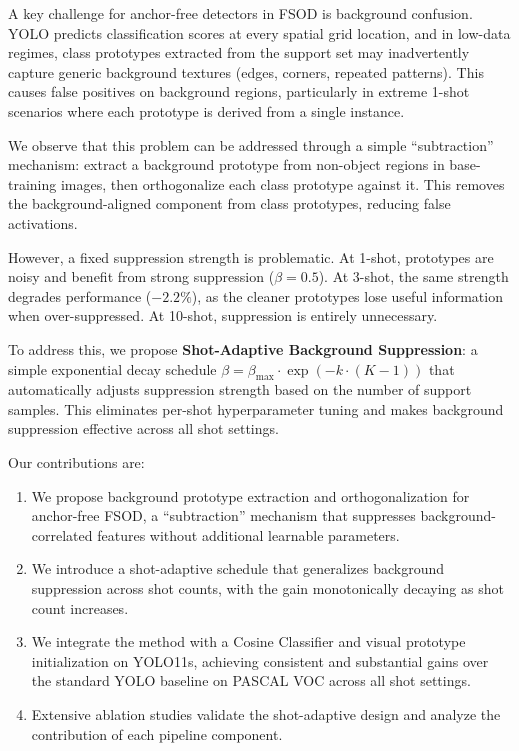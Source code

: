\documentclass[10pt,twocolumn,letterpaper]{article}
\begin{document}
A key challenge for anchor-free detectors in FSOD is background confusion.
YOLO predicts classification scores at every spatial grid location, and in low-data regimes,
class prototypes extracted from the support set may inadvertently capture generic background
textures (edges, corners, repeated patterns). This causes false positives on background regions,
particularly in extreme 1-shot scenarios where each prototype is derived from a single instance.

We observe that this problem can be addressed through a simple ``subtraction'' mechanism:
extract a background prototype from non-object regions in base-training images,
then orthogonalize each class prototype against it. This removes the background-aligned
component from class prototypes, reducing false activations.

However, a fixed suppression strength is problematic. At 1-shot, prototypes are noisy
and benefit from strong suppression ($\beta=0.5$). At 3-shot, the same strength degrades
performance ($-2.2\%$), as the cleaner prototypes lose useful information when over-suppressed.
At 10-shot, suppression is entirely unnecessary.

To address this, we propose \textbf{Shot-Adaptive Background Suppression}: a simple
exponential decay schedule $\beta = \beta_{\max} \cdot \exp(-k \cdot (K-1))$ that
automatically adjusts suppression strength based on the number of support samples.
This eliminates per-shot hyperparameter tuning and makes background suppression
effective across all shot settings.

Our contributions are:
\begin{enumerate}
    \item We propose background prototype extraction and orthogonalization for anchor-free FSOD,
          a ``subtraction'' mechanism that suppresses background-correlated features without
          additional learnable parameters.
    \item We introduce a shot-adaptive schedule that generalizes background suppression
          across shot counts, with the gain monotonically decaying as shot count increases.
    \item We integrate the method with a Cosine Classifier and visual prototype initialization
          on YOLO11s, achieving consistent and substantial gains over the standard YOLO baseline
          on PASCAL VOC across all shot settings.
    \item Extensive ablation studies validate the shot-adaptive design and analyze the
          contribution of each pipeline component.
\end{enumerate}
\end{document}
